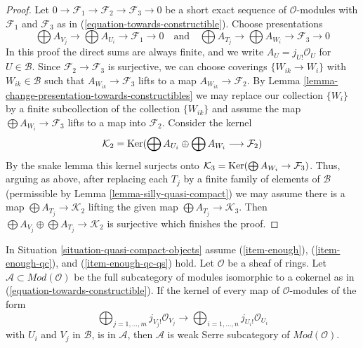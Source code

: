 \begin{proof}
Let $0 \to \mathcal{F}_1 \to \mathcal{F}_2 \to \mathcal{F}_3 \to 0$
be a short exact sequence of $\mathcal{O}$-modules with
$\mathcal{F}_1$ and $\mathcal{F}_3$ as in
(\ref{equation-towards-constructible}). Choose presentations
$$
\bigoplus A_{V_j} \to \bigoplus A_{U_i} \to \mathcal{F}_1 \to 0
\quad\text{and}\quad
\bigoplus A_{T_j} \to \bigoplus A_{W_i} \to \mathcal{F}_3 \to 0
$$
In this proof the direct sums are always finite, and
we write $A_U = j_{U!}\mathcal{O}_U$ for $U \in \mathcal{B}$.
Since $\mathcal{F}_2 \to \mathcal{F}_3$ is surjective, we can
choose coverings $\{W_{ik} \to W_i\}$ with $W_{ik} \in \mathcal{B}$
such that $A_{W_{ik}} \to \mathcal{F}_3$ lifts to a map
$A_{W_{ik}} \to \mathcal{F}_2$.
By Lemma \ref{lemma-change-presentation-towards-constructibles}
we may replace our collection $\{W_i\}$ by a finite subcollection
of the collection $\{W_{ik}\}$ and assume the map
$\bigoplus A_{W_i} \to \mathcal{F}_3$ lifts to a map into $\mathcal{F}_2$.
Consider the kernel
$$
\mathcal{K}_2 = \mathop{\mathrm{Ker}}(\bigoplus A_{U_i} \oplus \bigoplus A_{W_i}
\longrightarrow \mathcal{F}_2)
$$
By the snake lemma this kernel surjects onto
$\mathcal{K}_3 = \mathop{\mathrm{Ker}}(\bigoplus A_{W_i} \to \mathcal{F}_3)$.
Thus, arguing as above, after replacing each $T_j$ by a finite family of
elements of $\mathcal{B}$ (permissible by
Lemma \ref{lemma-silly-quasi-compact})
we may assume there is a map
$\bigoplus A_{T_j} \to \mathcal{K}_2$ lifting the given map
$\bigoplus A_{T_j} \to \mathcal{K}_3$.
Then $\bigoplus A_{V_j} \oplus \bigoplus A_{T_j} \to \mathcal{K}_2$
is surjective which finishes the proof.
\end{proof}

\begin{lemma}
\label{lemma-towards-constructible-when-serre-subcategory}
In Situation \ref{situation-quasi-compact-objects} assume
(\ref{item-enough}), (\ref{item-enough-qc}), and (\ref{item-enough-qc-qs})
hold. Let $\mathcal{O}$ be a sheaf of rings.
Let $\mathcal{A} \subset \textit{Mod}(\mathcal{O})$ be the full
subcategory of modules isomorphic to a cokernel as in
(\ref{equation-towards-constructible}).
If the kernel of every map of $\mathcal{O}$-modules of the form
$$
\bigoplus\nolimits_{j = 1, \ldots, m} j_{V_j!}\mathcal{O}_{V_j}
\longrightarrow
\bigoplus\nolimits_{i = 1, \ldots, n} j_{U_i!}\mathcal{O}_{U_i}
$$
with $U_i$ and $V_j$ in $\mathcal{B}$, is in $\mathcal{A}$, then
$\mathcal{A}$ is weak Serre subcategory of $\textit{Mod}(\mathcal{O})$.
\end{lemma}

